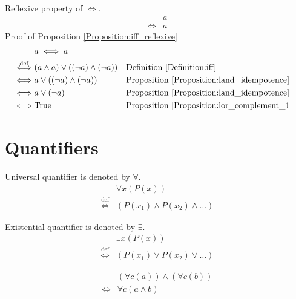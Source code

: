 \begin{prop}
\label{Proposition:iff_reflexive}
Reflexive property of $\iff$.
\begin{align*}
& a \\
\iff & a
\end{align*}
Proof of Proposition \ref{Proposition:iff_reflexive}
\begin{align*}
& a \iff a \\
\overset{\operatorname{def}}{\iff} & (a \land a) \lor ((\lnot a) \land (\lnot a))
& & \text{Definition \ref{Definition:iff}} \\
\iff & a \lor ((\lnot a) \land (\lnot a))
& & \text{Proposition \ref{Proposition:land_idempotence}} \\
\iff & a \lor (\lnot a)
& & \text{Proposition \ref{Proposition:land_idempotence}} \\
\iff & \text{True}
& & \text{Proposition \ref{Proposition:lor_complement_1}} \\
\end{align*}
\end{prop}

\section{Quantifiers}
\begin{defn}
Universal quantifier is denoted by $\forall$.
\begin{align*}
& \forall x (P(x)) \\
\overset{\operatorname{def}}{\iff} & (P(x_1) \land P(x_2) \land \dots)
\end{align*}
\end{defn}

\begin{defn}
Existential quantifier is denoted by $\exists$.
\begin{align*}
& \exists x (P(x)) \\
\overset{\operatorname{def}}{\iff} & (P(x_1) \lor P(x_2) \lor \dots)
\end{align*}
\end{defn}

\begin{prop}
\label{Proposition:forall_land_commutativity}
\begin{align*}
& (\forall c (a)) \land (\forall c (b)) \\
\iff & \forall c (a \land b)
\end{align*}
\end{prop}


